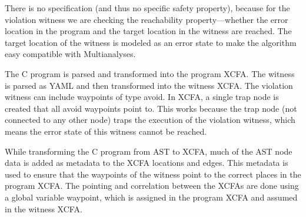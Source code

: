     
        
    
    


There is no specification (and thus no specific safety property), because for the 
violation witness we are checking the reachability property—whether the error location
in the program and the target location in the witness are reached. The target location
of the witness is modeled as an error state to make the algorithm easy compatible with Multianalyses.

The C program is parsed and transformed into the program XCFA. The witness is parsed as YAML and 
then transformed into the witness XCFA. The violation witness can include waypoints of type avoid. 
In XCFA, a single trap node is created that all avoid waypoints point to. This works because the 
trap node (not connected to any other node) traps the execution of the violation witness, which 
means the error state of this witness cannot be reached.

While transforming the C program from AST to XCFA, much of the AST node data is added as metadata 
to the XCFA locations and edges. This metadata is used to ensure that the waypoints of the witness 
point to the correct places in the program XCFA. The pointing and correlation between the XCFAs are 
done using a global variable waypoint, which is assigned in the program XCFA and assumed in the 
witness XCFA.

